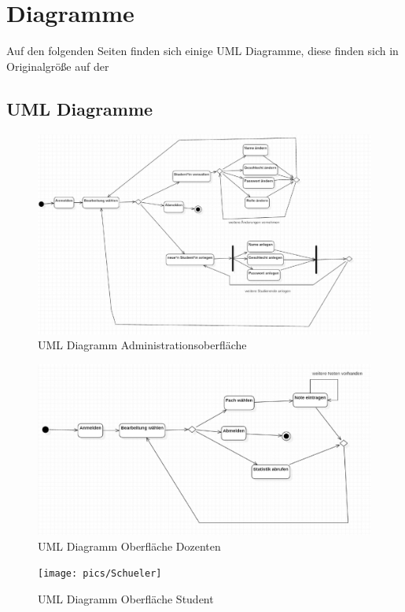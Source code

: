 \documentclass[12pt,a4paper,parskip]{scrreprt}
\begin{document}
\chapter{Diagramme}
Auf den folgenden Seiten finden sich einige UML Diagramme, diese finden sich in Originalgröße auf der 
\section{UML Diagramme}
\begin{figure}[!hbtp]%
\centering
\includegraphics[width=1\linewidth]{pics/AdminE}
\caption[Admin]{UML Diagramm Administrationsoberfläche}
\label{fig:AdminE}
\end{figure}
\begin{figure}[!hbtp]%
\centering
\includegraphics[width=1\linewidth]{pics/DozentIn}
\caption[Oberfläche Dozenten]{UML Diagramm Oberfläche Dozenten}
\label{fig:DozentIn}
\end{figure}
\begin{figure}
\centering
\texttt{[image: pics/Schueler]}
\caption[Oberfläche Student]{UML Diagramm Oberfläche Student}
\label{fig:Schueler}
\end{figure}
\end{document}
